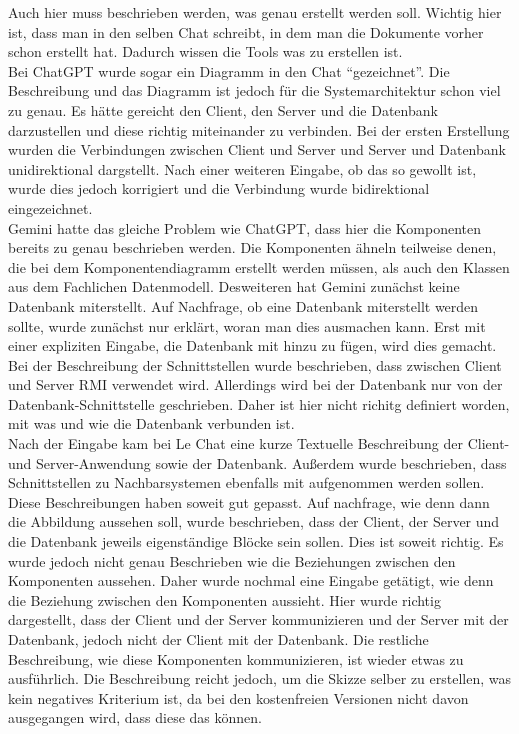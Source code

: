 Auch hier muss beschrieben werden, was genau erstellt werden soll. Wichtig hier ist, dass man in den selben Chat schreibt, in dem man die Dokumente vorher
schon erstellt hat. Dadurch wissen die Tools was zu erstellen ist.\\

Bei ChatGPT wurde sogar ein Diagramm in den Chat ``gezeichnet''. Die Beschreibung und das Diagramm ist jedoch für die Systemarchitektur schon viel zu genau.
Es hätte gereicht den Client, den Server und die Datenbank darzustellen und diese richtig miteinander zu verbinden. Bei der ersten Erstellung wurden 
die Verbindungen zwischen Client und Server und Server und Datenbank unidirektional dargstellt. Nach einer weiteren Eingabe, ob das so gewollt ist, wurde 
dies jedoch korrigiert und die Verbindung wurde bidirektional eingezeichnet.\\

Gemini hatte das gleiche Problem wie ChatGPT, dass hier die Komponenten bereits zu genau beschrieben werden. Die Komponenten ähneln teilweise denen, die bei 
dem Komponentendiagramm erstellt werden müssen, als auch den Klassen aus dem Fachlichen Datenmodell. Desweiteren hat Gemini zunächst keine 
Datenbank miterstellt. Auf Nachfrage, ob eine Datenbank miterstellt werden sollte, wurde zunächst nur erklärt, woran man dies ausmachen kann. 
Erst mit einer expliziten Eingabe, die Datenbank mit hinzu zu fügen, wird dies gemacht. Bei der Beschreibung der Schnittstellen wurde beschrieben, 
dass zwischen Client und Server RMI verwendet wird. Allerdings wird bei der Datenbank nur von der Datenbank-Schnittstelle geschrieben. Daher ist hier 
nicht richitg definiert worden, mit was und wie die Datenbank verbunden ist.\\

Nach der Eingabe kam bei Le Chat eine kurze Textuelle Beschreibung der Client- und Server-Anwendung sowie der Datenbank. Außerdem wurde beschrieben, 
dass Schnittstellen zu Nachbarsystemen ebenfalls mit aufgenommen werden sollen. Diese Beschreibungen haben soweit gut gepasst. Auf nachfrage, wie denn 
dann die Abbildung aussehen soll, wurde beschrieben, dass der Client, der Server und die Datenbank jeweils eigenständige Blöcke sein sollen. Dies ist soweit
richtig. Es wurde jedoch nicht genau Beschrieben wie die Beziehungen zwischen den Komponenten aussehen. Daher wurde nochmal eine Eingabe getätigt, wie denn 
die Beziehung zwischen den Komponenten aussieht. Hier wurde richtig dargestellt, dass der Client und der Server kommunizieren und der Server mit der Datenbank, 
jedoch nicht der Client mit der Datenbank. Die restliche Beschreibung, wie diese Komponenten kommunizieren, ist wieder etwas zu ausführlich. Die Beschreibung 
reicht jedoch, um die Skizze selber zu erstellen, was kein negatives Kriterium ist, da bei den kostenfreien Versionen nicht davon ausgegangen wird, dass diese 
das können.\\

